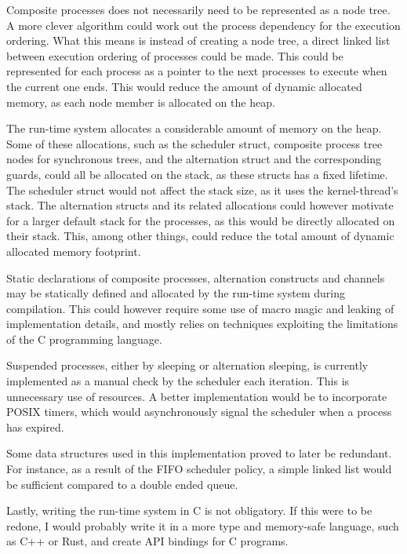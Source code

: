 Composite processes does not necessarily need to be represented as a node tree. A more clever algorithm could work out the process dependency for the execution ordering. What this means is instead of creating a node tree, a direct linked list between execution ordering of processes could be made. This could be represented for each process as a pointer to the next processes to execute when the current one ends. This would reduce the amount of dynamic allocated memory, as each node member is allocated on the heap. 

The run\hyp{}time system allocates a considerable amount of memory on the heap. Some of these allocations, such as the scheduler struct, composite process tree nodes for synchronous trees, and the alternation struct and the corresponding guards, could all be allocated on the stack, as these structs has a fixed lifetime. The scheduler struct would not affect the stack size, as it uses the kernel\hyp{}thread's stack. The alternation structs and its related allocations could however motivate for a larger default stack for the processes, as this would be directly allocated on their stack. This, among other things, could reduce the total amount of dynamic allocated memory footprint.

Static declarations of composite processes, alternation constructs and channels may be statically defined and allocated by the run\hyp{}time system during compilation. This could however require some use of macro magic and leaking of implementation details, and mostly relies on techniques exploiting the limitations of the C programming language.

Suspended processes, either by sleeping or alternation sleeping, is currently implemented as a manual check by the scheduler each iteration. This is unnecessary use of resources. A better implementation would be to incorporate POSIX timers, which would asynchronously signal the scheduler when a process has expired.

Some data structures used in this implementation proved to later be redundant. For instance, as a result of the FIFO scheduler policy, a simple linked list would be sufficient compared to a double ended queue. 

Lastly, writing the run\hyp{}time system in C is not obligatory. If this were to be redone, I would probably write it in a more type and memory\hyp{}safe language, such as C++ or Rust, and create API bindings for C programs. 

